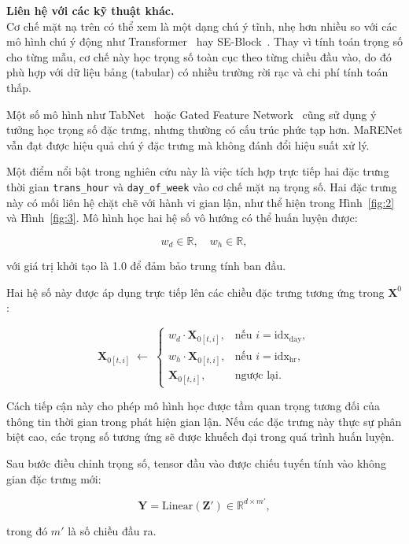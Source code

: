 \textbf{Liên hệ với các kỹ thuật khác.}\\
Cơ chế mặt nạ trên có thể xem là một dạng chú ý tĩnh, nhẹ hơn nhiều so với các mô hình chú ý động như Transformer~\cite{vaswani2017attention} hay SE-Block~\cite{hu2018squeeze}. Thay vì tính toán trọng số cho từng mẫu, cơ chế này học trọng số toàn cục theo từng chiều đầu vào, do đó phù hợp với dữ liệu bảng (tabular) có nhiều trường rời rạc và chi phí tính toán thấp.

Một số mô hình như TabNet~\cite{arik2019tabnet} hoặc Gated Feature Network~\cite{arik2019tabnet} cũng sử dụng ý tưởng học trọng số đặc trưng, nhưng thường có cấu trúc phức tạp hơn. MaRENet vẫn đạt được hiệu quả chú ý đặc trưng mà không đánh đổi hiệu suất xử lý.

Một điểm nổi bật trong nghiên cứu này là việc tích hợp trực tiếp hai đặc trưng thời gian \texttt{trans\_hour} và \texttt{day\_of\_week} vào cơ chế mặt nạ trọng số. Hai đặc trưng này có mối liên hệ chặt chẽ với hành vi gian lận, như thể hiện trong Hình~\ref{fig:2} và Hình~\ref{fig:3}. Mô hình học hai hệ số vô hướng có thể huấn luyện được:

\[
w_d \in \mathbb{R}, \quad w_h \in \mathbb{R},
\]

với giá trị khởi tạo là 1.0 để đảm bảo trung tính ban đầu.

Hai hệ số này được áp dụng trực tiếp lên các chiều đặc trưng tương ứng trong \( \mathbf{X}^0 \):

\[
\mathbf{X}_{0[t,i]} \;\longleftarrow\;
\begin{cases}
  w_d \cdot \mathbf{X}_{0[t,i]}, & \text{nếu } i = \mathrm{idx}_{\text{day}},\\[6pt]
  w_h \cdot \mathbf{X}_{0[t,i]}, & \text{nếu } i = \mathrm{idx}_{\text{hr}},\\[3pt]
  \mathbf{X}_{0[t,i]},           & \text{ngược lại}.
\end{cases}
\]

Cách tiếp cận này cho phép mô hình học được tầm quan trọng tương đối của thông tin thời gian trong phát hiện gian lận. Nếu các đặc trưng này thực sự phân biệt cao, các trọng số tương ứng sẽ được khuếch đại trong quá trình huấn luyện.

Sau bước điều chỉnh trọng số, tensor đầu vào được chiếu tuyến tính vào không gian đặc trưng mới:

\[
\mathbf{Y} = \mathrm{Linear}(\mathbf{Z}') \in \mathbb{R}^{d \times m'},
\]

trong đó \(m'\) là số chiều đầu ra.

